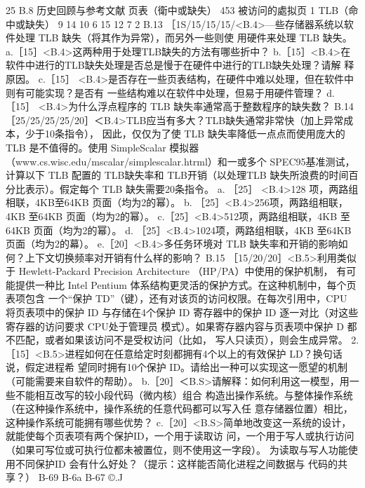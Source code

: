 25
B.8 历史回顾与参考文献
页表（衛中或缺失）
453
被访问的處拟页
1
TLB（命中或缺失）
9
14
10
6
15
12
7
2
B.13 ［1S/15/15/15/<B.4>—些存储器系统以软件处理 TLB 缺失（将其作为异常），而另外一些则使
用硬件来处理 TLB 缺失。
a.［15］<B.4>这两种用于处理TLB缺失的方法有哪些折中？
b.［15］<B.4>在软件中进行的TLB缺失处理是否总是慢于在硬件中进行的TLB缺失处理？请解
释原因。
c.［15］ <B.4>是否存在一些页表结构，在硬件中难以处理，但在软件中则有可能实现？是否有
一些结构难以在软件中处理，但易于用硬件管理？
d. ［15］ <B.4>为什么浮点程序的 TLB 缺失率通常高于整数程序的缺失数？
B.14 ［25/25/25/25/20］＜B.4>TLB应当有多大？TLB缺失通常非常快（加上异常成本，少于10条指令），
因此，仅仅为了使 TLB 缺失率降低一点点而使用庞大的 TLB 是不值得的。使用 SimpleScalar
模拟器（www.cs.wisc.edu/mscalar/simplescalar.htrml）和一或多个 SPEC95基准测试，计算以下
TLB 配置的 TLB缺失率和 TLB开销（以处理TLB 缺失所浪费的时间百分比表示）。假定每个
TLB 缺失需要20条指令。
a. ［25］ <B.4>128 项，两路组相联，4KB至64KB 页面（均为2的幂）。
b. ［25］<B.4>256项，两路组相联，4KB 至64KB 页面（均为2的幂）。
c.［25］<B.4>512项，两路组相联，4KB 至64KB 页面（均为2的幂）。
d. ［25］<B.4>1024项，两路组相联，4KB 至64KB 页面（均为2的幕）。
e.［20］<B.4>多任务环境对 TLB 缺失率和开销的影响如何？上下文切换频率对开销有什么样的影响？
B.15 ［15/20/20］<B.5>利用类似于 Hewlett-Packard Precision Architecture （HP/PA）中使用的保护机制，
有可能提供一种比 Intel Pentium 体系结构更灵活的保护方式。在这种机制中，每个页表项包含
一个“保护 TD”（键），还有对该页的访问权限。在每次引用中，CPU 将页表项中的保护 ID
与存储在4个保护 ID 寄存器中的保护 ID 逐一对比（对这些寄存器的访问要求 CPU处于管理员
模式）。如果寄存器内容与页表项中保护 D 都不匹配，或者如果该访问不是受权访问（比如，
写人只读页），则会生成异常。
2. ［15］<B.5>进程如何在任意给定时刻都拥有4个以上的有效保护 LD？换句话说，假定进程希
望同时拥有10个保护 ID。请给出一种可以实现这一愿望的机制（可能需要来自软件的帮助）。
b.［20］＜B.S>请解释：如何利用这一模型，用一些不能相互改写的较小段代码（微内核）组合
构造出操作系统。与整体操作系统（在这种操作系统中，操作系统的任意代码都可以写入任
意存储器位置）相比，这种操作系统可能拥有哪些优势？
c.［20］<B.S>简单地改变这一系统的设计，就能使每个页表项有两个保护ID，一个用于读取访
问，一个用于写人或执行访问（如果可写位或可执行位都未被置位，则不使用这一字段）。
为读取与写人功能使用不同保护ID 会有什么好处？（提示：这样能否简化进程之间数据与
代码的共享？）
B-69
B-6a
B-67
©.J